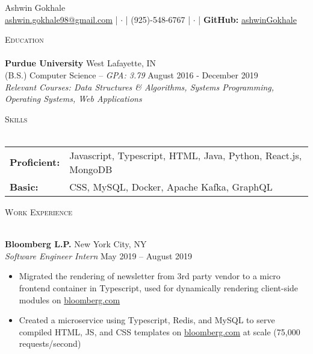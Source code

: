 \documentclass[letterpaper, 10pt]{article}
\newcommand{\lineunder} {
    \vspace*{-8pt} \\
    \hspace*{-18pt} \hrulefill \\
}
\newcommand{\header} [1] {
    {
        \hspace*{-18pt}\vspace*{6pt}
        {\large\textsc{#1}}
    }
    \vspace*{-6pt} \lineunder
}
\newcommand{\contact} [2] {
    \vspace*{-10pt}
    \begin{center}
        {\Huge#1}
        \vspace*{5pt}
        \\ 
        #2
    \end{center}
    \vspace*{-10pt}
}
\begin{document}
\vspace*{20pt}

\vspace*{-10pt}
\contact{Ashwin Gokhale}
{
    \href{mailto:ashwin.gokhale98@gmail.com}{ashwin.gokhale98@gmail.com} |
    $\cdot$ | (925)-548-6767 | $\cdot$ |
    \textbf{GitHub:}
    \href{https://goo.gl/R79aeK}{ashwinGokhale}
}

\vspace{10pt}

\header{Education}
\textbf{Purdue University}
\hfill West Lafayette, IN\\
(B.S.) Computer Science -- \textit{GPA: 3.79}
\hfill August 2016 - December 2019
\\

\textit{Relevant Courses: Data Structures \& Algorithms, Systems Programming, Operating Systems, Web Applications}

\vspace{2mm}

\vspace{1mm}
\header{Skills}
\vspace{1mm}
\begin{tabular}{ l l }
    \textbf{Proficient:} & Javascript, Typescript, HTML, Java, Python, React.js, MongoDB \\
    \textbf{Basic:}      & CSS, MySQL, Docker, Apache Kafka, GraphQL                     \\
\end{tabular}
\vspace{2mm}

\header{Work Experience}
\vspace{1mm}

\textbf{Bloomberg L.P.} \hfill New York City, NY\\
\textit{Software Engineer Intern} \hfill May 2019 -- August 2019\\
\vspace{-1mm}
\begin{itemize} \itemsep 1pt
    \item Migrated the rendering of newsletter from 3rd party vendor to a micro frontend container in Typescript, used for dynamically rendering client-side modules on \href{https://www.bloomberg.com}{bloomberg.com}
    \item Created a microservice using Typescript, Redis, and MySQL to serve compiled HTML, JS, and CSS templates on
          \href{https://www.bloomberg.com}{bloomberg.com} at scale (75,000 requests/second)
\end{itemize}
\end{document}
